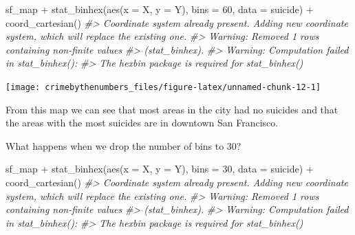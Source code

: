\documentclass[
]{krantz}
\makeatletter
\newenvironment{Shaded}{\begin{snugshade}}{\end{snugshade}}
\newcommand{\AttributeTok}[1]{\textcolor[rgb]{0.61,0.61,0.61}{#1}}
\newcommand{\CommentTok}[1]{\textcolor[rgb]{0.37,0.37,0.37}{\textit{#1}}}
\newcommand{\DecValTok}[1]{\textcolor[rgb]{0.06,0.06,0.06}{#1}}
\newcommand{\FunctionTok}[1]{\textcolor[rgb]{0,0,0}{#1}}
\newcommand{\NormalTok}[1]{#1}
\newcommand{\SpecialCharTok}[1]{\textcolor[rgb]{0,0,0}{#1}}
\newenvironment{kframe}{%
\medskip{}
\setlength{\fboxsep}{.8em}
 \def\at@end@of@kframe{}%
 \ifinner\ifhmode%
  \def\at@end@of@kframe{\end{minipage}}%
  \begin{minipage}{\columnwidth}%
 \fi\fi%
 \def\FrameCommand##1{\hskip\@totalleftmargin \hskip-\fboxsep
 \colorbox{shadecolor}{##1}\hskip-\fboxsep
     \hskip-\linewidth \hskip-\@totalleftmargin \hskip\columnwidth}%
 \MakeFramed {\advance\hsize-\width
   \@totalleftmargin\z@ \linewidth\hsize
   \@setminipage}}%
 {\par\unskip\endMakeFramed%
 \at@end@of@kframe}
\renewenvironment{Shaded}{\begin{kframe}}{\end{kframe}}
\makeatother
\begin{document}
\begin{Shaded}
\begin{Highlighting}[]
\NormalTok{sf\_map }\SpecialCharTok{+}
  \FunctionTok{stat\_binhex}\NormalTok{(}\FunctionTok{aes}\NormalTok{(}\AttributeTok{x =}\NormalTok{ X, }\AttributeTok{y =}\NormalTok{ Y),}
              \AttributeTok{bins =} \DecValTok{60}\NormalTok{,}
              \AttributeTok{data =}\NormalTok{ suicide) }\SpecialCharTok{+}
  \FunctionTok{coord\_cartesian}\NormalTok{() }
\CommentTok{\#\textgreater{} Coordinate system already present. Adding new coordinate system, which will replace the existing one.}
\CommentTok{\#\textgreater{} Warning: Removed 1 rows containing non{-}finite values}
\CommentTok{\#\textgreater{} (stat\_binhex).}
\CommentTok{\#\textgreater{} Warning: Computation failed in \textasciigrave{}stat\_binhex()\textasciigrave{}:}
\CommentTok{\#\textgreater{} The \textasciigrave{}hexbin\textasciigrave{} package is required for \textasciigrave{}stat\_binhex()\textasciigrave{}}
\end{Highlighting}
\end{Shaded}

\begin{center}\texttt{[image: crimebythenumbers\_files/figure-latex/unnamed-chunk-12-1]} \end{center}

From this map we can see that most areas in the city had no suicides and that the areas with the most suicides are in downtown San Francisco.

What happens when we drop the number of bins to 30?

\begin{Shaded}
\begin{Highlighting}[]
\NormalTok{sf\_map }\SpecialCharTok{+}
  \FunctionTok{stat\_binhex}\NormalTok{(}\FunctionTok{aes}\NormalTok{(}\AttributeTok{x =}\NormalTok{ X, }\AttributeTok{y =}\NormalTok{ Y),}
              \AttributeTok{bins =} \DecValTok{30}\NormalTok{,}
              \AttributeTok{data =}\NormalTok{ suicide) }\SpecialCharTok{+}
  \FunctionTok{coord\_cartesian}\NormalTok{() }
\CommentTok{\#\textgreater{} Coordinate system already present. Adding new coordinate system, which will replace the existing one.}
\CommentTok{\#\textgreater{} Warning: Removed 1 rows containing non{-}finite values}
\CommentTok{\#\textgreater{} (stat\_binhex).}
\CommentTok{\#\textgreater{} Warning: Computation failed in \textasciigrave{}stat\_binhex()\textasciigrave{}:}
\CommentTok{\#\textgreater{} The \textasciigrave{}hexbin\textasciigrave{} package is required for \textasciigrave{}stat\_binhex()\textasciigrave{}}
\end{Highlighting}
\end{Shaded}
\end{document}
